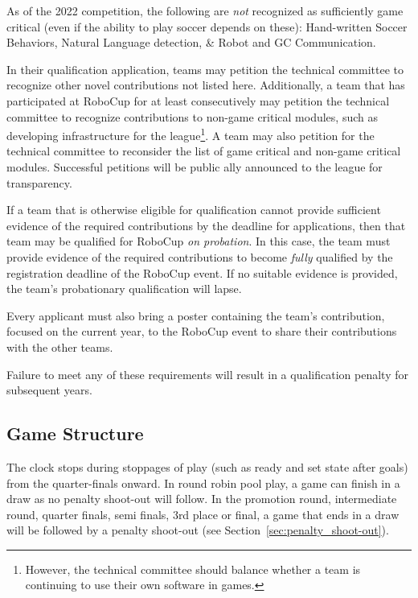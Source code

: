 As of the 2022 competition, the following are \textit{not} recognized as sufficiently game critical (even if the ability to play soccer depends on these):
Hand-written Soccer Behaviors, Natural Language detection, \& Robot and GC Communication.

In their qualification application, teams may petition the technical committee to recognize other novel contributions not listed here.
Additionally, a team that has participated at RoboCup for at least \NovelContributionTime consecutively may petition the technical committee to recognize contributions to non-game critical modules, such as developing infrastructure for the league\footnote{However, the technical committee should balance whether a team is continuing to use their own software in games.}.
A team may also petition for the technical committee to reconsider the list of game critical and non-game critical modules.
Successful petitions will be public ally announced to the league for transparency.

If a team that is otherwise eligible for qualification cannot provide sufficient evidence of the required contributions by the deadline for applications, then that team may be qualified for RoboCup \textit{on probation}.
In this case, the team must provide evidence of the required contributions to become \textit{fully} qualified by the registration deadline of the RoboCup event.
If no suitable evidence is provided, the team's probationary qualification will lapse.

Every applicant must also bring a poster containing the team's contribution, focused on the current year, to the RoboCup event to share their contributions with the other teams.

Failure to meet any of these requirements will result in a qualification penalty for subsequent years.

\subsection{Game Structure}

The clock stops during stoppages of play (such as ready and set state after goals) from the quarter-finals onward.  In round robin pool play, a game can finish in a draw as no penalty shoot-out will follow. In the promotion round, intermediate round, quarter finals, semi finals, 3rd place or final, a game that ends in a draw will be followed by a penalty shoot-out (see Section~\ref{sec:penalty_shoot-out}).

